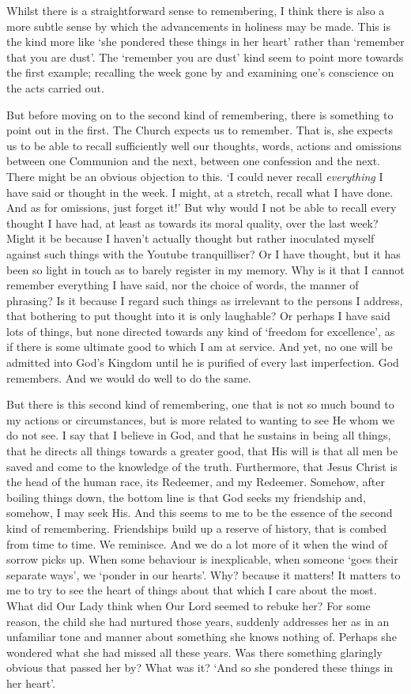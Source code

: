 \documentclass[12pt]{article}
\begin{document}
Whilst there is a straightforward sense to remembering, I think there is also a more subtle sense by which the advancements in holiness may be made. This is the kind more like `she pondered these things in her heart' rather than `remember that you are dust'. The `remember you are dust' kind seem to point more towards the first example; recalling the week gone by and examining one's conscience on the acts carried out.

But before moving on to the second kind of remembering, there is something to point out in the first. The Church expects us to remember. That is, she expects us to be able to recall sufficiently well our thoughts, words, actions and omissions between one Communion and the next, between one confession and the next. There might be an obvious objection to this. `I could never recall \emph{everything} I have said or thought in the week. I might, at a stretch, recall what I have done. And as for omissions, just forget it!' But why would I not be able to recall every thought I have had, at least as towards its moral quality, over the last week? Might it be because I haven't actually thought but rather inoculated myself against such things with the Youtube tranquilliser? Or I have thought, but it has been so light in touch as to barely register in my memory. Why is it that I cannot remember everything I have said, nor the choice of words, the manner of phrasing? Is it because I regard such things as irrelevant to the persons I address, that bothering to put thought into it is only laughable? Or perhaps I have said lots of things, but none directed towards any kind of `freedom for excellence', as if there is some ultimate good to which I am at service. And yet, no one will be admitted into God's Kingdom until he is purified of every last imperfection. God remembers. And we would do well to do the same.

But there is this second kind of remembering, one that is not so much bound to my actions or circumstances, but is more related to wanting to see He whom we do not see. I say that I believe in God, and that he sustains in being all things, that he directs all things towards a greater good, that His will is that all men be saved and come to the knowledge of the truth. Furthermore, that Jesus Christ is the head of the human race, its Redeemer, and my Redeemer. Somehow, after boiling things down, the bottom line is that God seeks my friendship and, somehow, I may seek His. And this seems to me to be the essence of the second kind of remembering. Friendships build up a reserve of history, that is combed from time to time. We reminisce. And we do a lot more of it when the wind of sorrow picks up. When some behaviour is inexplicable, when someone `goes their separate ways', we `ponder in our hearts'. Why? because it matters! It matters to me to try to see the heart of things about that which I care about the most. What did Our Lady think when Our Lord seemed to rebuke her? For some reason, the child she had nurtured those years, suddenly addresses her as in an unfamiliar tone and manner about something she knows nothing of. Perhaps she wondered what she had missed all these years. Was there something glaringly obvious that passed her by? What was it? `And so she pondered these things in her heart'.
\end{document}
